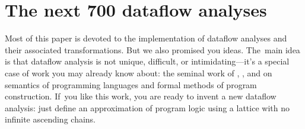 \documentclass[blockstyle,preprint,natbib,nocopyrightspace]{sigplanconf}
\newcommand{\authornote}[1]{{\em #1}}
\def\authornote#1{\unskip\relax}
\newcommand{\simon}[1]{\authornote{SLPJ: #1}}
\newcommand{\norman}[1]{\authornote{NR: #1}}
\let\remark\norman
\newcommand\seclabel[1]{\label{sec:#1}}
\begin{document}
\section{The next 700 dataflow analyses}

\seclabel{logic}
\seclabel{next-700}



Most of this paper is devoted to the implementation of dataflow
analyses and their associated transformations.
But we also promised you ideas.
The~main idea is that dataflow analysis is not unique,
difficult, or intimidating---it's a special case of work you may
already know about:
the seminal work of
\citet{floyd:assigning-meanings},
\citet{hoare:axiomatic-basis},
and
\citet{dijkstra:discipline}
on semantics of programming languages and
 formal methods of program construction.
If~you like this work, you are ready to invent a new
dataflow analysis:
just define an approximation of program logic
using a lattice with no infinite ascending chains.
\end{document}
